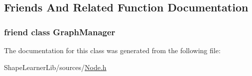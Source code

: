 \subsection{Friends And Related Function Documentation}
\hypertarget{class_node_1_1_access_a4f73c83d7340dc64ca31fa4fdf2ab4b8}{}
\subsubsection[{Graph\+Manager}]{\setlength{\rightskip}{0pt plus 5cm}friend class {\bf Graph\+Manager}\hspace{0.3cm}{\ttfamily [friend]}}\label{class_node_1_1_access_a4f73c83d7340dc64ca31fa4fdf2ab4b8}


The documentation for this class was generated from the following file\+:\begin{DoxyCompactItemize}
\item 
Shape\+Learner\+Lib/sources/\hyperlink{_node_8h}{Node.\+h}\end{DoxyCompactItemize}
